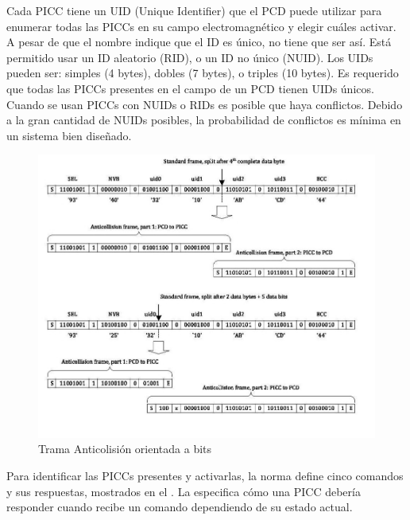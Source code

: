 \documentclass[a4paper, twoside, 11pt]{report}
\begin{document}
Cada PICC tiene un UID (Unique Identifier) que el PCD puede utilizar para enumerar todas las PICCs en su campo electromagnético y elegir cuáles activar. A pesar de que el nombre indique que el ID es único, no tiene que ser así. Está permitido usar un ID aleatorio (RID), o un ID no único (NUID). Los UIDs pueden ser: simples (4 bytes), dobles (7 bytes), o triples (10 bytes). Es requerido que todas las PICCs presentes en el campo de un PCD tienen UIDs únicos. Cuando se usan PICCs con NUIDs o RIDs es posible que haya conflictos. Debido a la gran cantidad de NUIDs posibles, la probabilidad de conflictos es mínima en un sistema bien diseñado.

\begin{figure}[htb]
  \centering
  \includegraphics[scale=0.5]{./img/anticollision_frames}
  \caption{Trama Anticolisión orientada a bits~\cite[Modificaciones Mías]{iso14443-3}}
  \label{fig:anticollision}
\end{figure}

Para identificar las PICCs presentes y activarlas, la norma define cinco comandos y sus respuestas, mostrados en el . La  especifica cómo una PICC debería responder cuando recibe un comando dependiendo de su estado actual.
\end{document}

